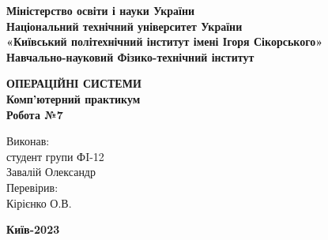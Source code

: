 \documentclass[a4paper,12pt]{article}
\begin{document}
    \pagestyle{fancy}
    \fancyhead{}
    \begin{center}
        \large{\textbf{Міністерство освіти і науки України\\
                Національний технічний університет України\\
                «Київський політехнічний інститут імені Ігоря Сікорського»\\
                Навчально-науковий Фізико-технічний інститут}}\\
        \hfill \break \hfill \break \hfill\break \hfill \break \hfill \break \hfill \break \hfill \break
        \hfill \break \hfill \break \hfill \break
        \begin{center}
            \normalsize{\textbf{ОПЕРАЦІЙНІ СИСТЕМИ\\
            Комп’ютерний практикум\\
            Робота №7}}
        \end{center}
    \end{center}
    \hfill \break \hfill \break \hfill \break \hfill \break \hfill \break \hfill \break \hfill \break
    \hfill \break \hfill \break \hfill \break \hfill \break 
    \begin{flushright}
        \large{ \hspace{35pt} Виконав:\\
            студент групи ФI-12\\
            Завалій Олександр\\} 
        \large{ \hspace{35pt} Перевірив:\\
        Кірієнко О.В.} 
    \end{flushright}
    \hfill \break \hfill \break \hfill \break \hfill \break \hfill \break \hfill \break \hfill \break
    \hfill \break
    \begin{center} \textbf{Київ-2023} \end{center}
    \thispagestyle{empty}
\end{document}
